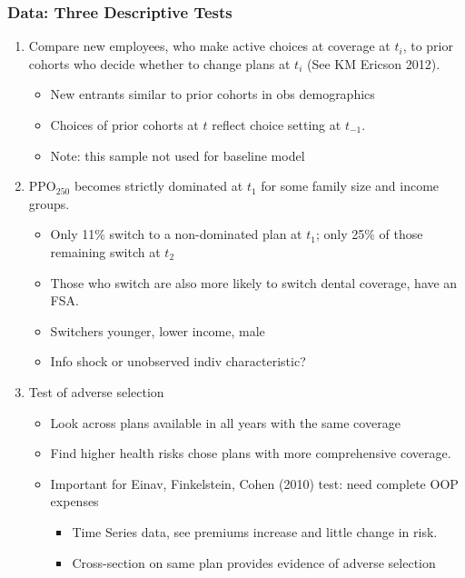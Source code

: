 \begin{frame}
\frametitle{Data: Three Descriptive Tests}
\begin{enumerate}
\footnotesize
\item Compare new employees, who make active choices at coverage at $%
t_{i}$, to prior cohorts who decide whether to change plans at $t_{i}$ (See
KM Ericson 2012).
\begin{itemize}
\footnotesize
\item New entrants similar to prior cohorts in obs demographics
\item Choices of prior cohorts at $t$ reflect choice setting at $%
t_{-1}$.
\item Note: this sample not used for baseline model
\end{itemize}
\item PPO$_{250}$ becomes strictly dominated at $t_{1}$ for some family
size and income groups. 

\begin{itemize}
\footnotesize

\item Only 11\% switch to a non-dominated plan at $t_{1}$; only 25\% of
those remaining switch at $t_{2}$

\item Those who switch are also more likely to switch dental coverage, have
an FSA. 

\item Switchers younger, lower income, male

\item Info shock or unobserved indiv characteristic?
\end{itemize}
\item Test of adverse selection

\begin{itemize}
\footnotesize

\item Look across plans available in all years with the same coverage

\item Find higher health risks chose plans with more comprehensive coverage. 

\item Important for Einav, Finkelstein, Cohen (2010) test: need complete  OOP expenses
\begin{itemize}\footnotesize

\item Time Series data, see premiums increase and little change in risk.
\item Cross-section on same plan provides evidence of adverse selection
\end{itemize}

\end{itemize}
\end{enumerate}
\end{frame}




